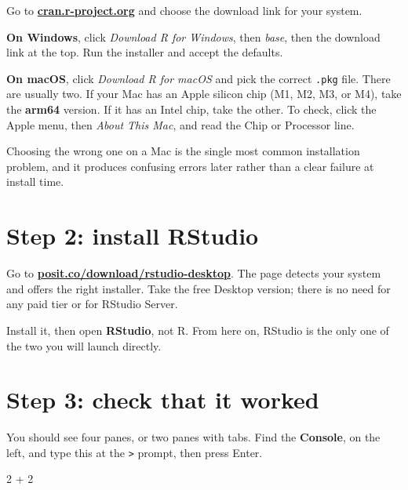 \documentclass[
  a4paper,
]{scrbook}
\newenvironment{Shaded}{\begin{snugshade}}{\end{snugshade}}
\newcommand{\DecValTok}[1]{\textcolor[rgb]{0.68,0.00,0.00}{#1}}
\newcommand{\SpecialCharTok}[1]{\textcolor[rgb]{0.37,0.37,0.37}{#1}}
\begin{document}

Go to \href{https://cran.r-project.org}{\textbf{cran.r-project.org}} and
choose the download link for your system.

\textbf{On Windows}, click \emph{Download R for Windows}, then
\emph{base}, then the download link at the top. Run the installer and
accept the defaults.

\textbf{On macOS}, click \emph{Download R for macOS} and pick the
correct \texttt{.pkg} file. There are usually two. If your Mac has an
Apple silicon chip (M1, M2, M3, or M4), take the \textbf{arm64} version.
If it has an Intel chip, take the other. To check, click the Apple menu,
then \emph{About This Mac}, and read the Chip or Processor line.

Choosing the wrong one on a Mac is the single most common installation
problem, and it produces confusing errors later rather than a clear
failure at install time.

\section*{Step 2: install RStudio}\label{step-2-install-rstudio}


Go to
\href{https://posit.co/download/rstudio-desktop}{\textbf{posit.co/download/rstudio-desktop}}.
The page detects your system and offers the right installer. Take the
free Desktop version; there is no need for any paid tier or for RStudio
Server.

Install it, then open \textbf{RStudio}, not R. From here on, RStudio is
the only one of the two you will launch directly.

\section*{Step 3: check that it
worked}\label{step-3-check-that-it-worked}


You should see four panes, or two panes with tabs. Find the
\textbf{Console}, on the left, and type this at the
\texttt{\textgreater{}} prompt, then press Enter.

\begin{Shaded}
\begin{Highlighting}[]
\DecValTok{2} \SpecialCharTok{+} \DecValTok{2}
\end{Highlighting}
\end{Shaded}
\end{document}
